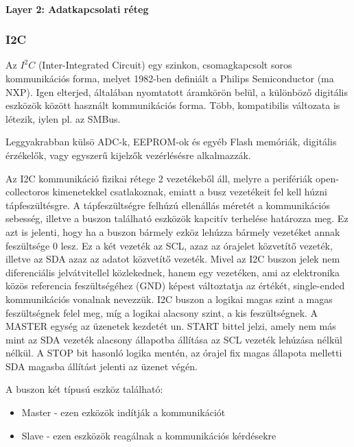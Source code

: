 \paragraph{Layer 2: Adatkapcsolati réteg}



\subsubsection{I2C}

Az $I^2C$ (Inter-Integrated Circuit) egy szinkon, csomagkapcsolt soros kommunikációs forma, melyet 1982-ben definiált a Philips Semiconductor (ma NXP). Igen elterjed, általában nyomtatott áramkörön belül, a különböző digitális eszközök között használt kommunikációs forma. Több, kompatibilis változata is létezik, iylen pl. az SMBus.

Leggyakrabban külsö ADC-k, EEPROM-ok és egyéb Flash memóriák, digitális érzékelők,  vagy egyszerű kijelzők vezérlésésre alkalmazzák.

Az I2C kommunikáció fizikai rétege 2 vezetékeből áll, melyre a perifériák open-collectoros kimenetekkel csatlakoznak, emiatt a busz vezetékeit fel kell húzni tápfeszültésgre. A tápfeszültségre felhúzú ellenállás méretét a kommunikációs sebesség, illetve a buszon található eszközök kapcitív terhelése határozza meg. Ez azt is jelenti, hogy ha a buszon bármely ezköz lehúzza bármely vezetéket annak feszültsége 0 lesz. Ez a két vezeték az SCL, azaz az órajelet közvetítő vezeték, illetve az SDA azaz az adatot közvetítő vezeték. Mivel az I2C buszon jelek nem diferenciális jelvátvitellel közlekednek, hanem egy vezetéken, ami az elektronika közös referencia feszültségéhez (GND) képest változtatja az értékét, single-ended kommunikációs vonalnak nevezzük. I2C buszon a logikai magas szint a magas feszültségnek felel meg, míg a logikai alacsony szint, a kis feszültségnek. A MASTER egység az üzenetek kezdetét un. START bittel jelzi, amely nem más mint az SDA vezeték alacsony állapotba állítása az SCL vezeték lehúzása nélkül nélkül. A STOP bit hasonló logika mentén, az órajel fix magas állapota melletti SDA magasba állítást jelenti az üzenet végén.



A buszon két típusú eszköz található:
\begin{itemize}
    \item Master - ezen ezközök indítják a kommunikációt
    \item Slave - ezen eszközök reagálnak a kommunikációs kérdésekre
\end{itemize}


